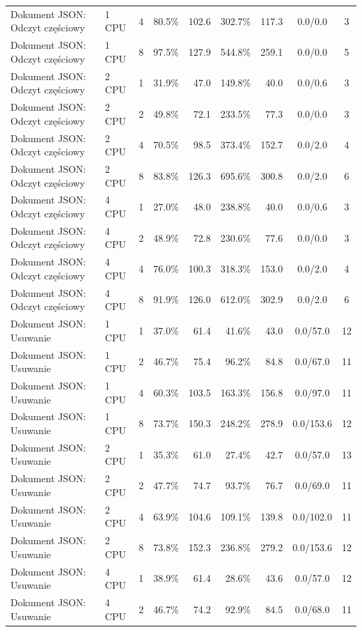 \begin{table}[ht]
{\begin{tabular}{llcrrrrcc}
Dokument JSON: Odczyt częściowy & 1 CPU & 4 & 80.5\% & 102.6 & 302.7\% & 117.3 & 0.0/0.0 & 3 \\
Dokument JSON: Odczyt częściowy & 1 CPU & 8 & 97.5\% & 127.9 & 544.8\% & 259.1 & 0.0/0.0 & 5 \\
Dokument JSON: Odczyt częściowy & 2 CPU & 1 & 31.9\% & 47.0 & 149.8\% & 40.0 & 0.0/0.6 & 3 \\
Dokument JSON: Odczyt częściowy & 2 CPU & 2 & 49.8\% & 72.1 & 233.5\% & 77.3 & 0.0/0.0 & 3 \\
Dokument JSON: Odczyt częściowy & 2 CPU & 4 & 70.5\% & 98.5 & 373.4\% & 152.7 & 0.0/2.0 & 4 \\
Dokument JSON: Odczyt częściowy & 2 CPU & 8 & 83.8\% & 126.3 & 695.6\% & 300.8 & 0.0/2.0 & 6 \\
Dokument JSON: Odczyt częściowy & 4 CPU & 1 & 27.0\% & 48.0 & 238.8\% & 40.0 & 0.0/0.6 & 3 \\
Dokument JSON: Odczyt częściowy & 4 CPU & 2 & 48.9\% & 72.8 & 230.6\% & 77.6 & 0.0/0.0 & 3 \\
Dokument JSON: Odczyt częściowy & 4 CPU & 4 & 76.0\% & 100.3 & 318.3\% & 153.0 & 0.0/2.0 & 4 \\
Dokument JSON: Odczyt częściowy & 4 CPU & 8 & 91.9\% & 126.0 & 612.0\% & 302.9 & 0.0/2.0 & 6 \\
Dokument JSON: Usuwanie & 1 CPU & 1 & 37.0\% & 61.4 & 41.6\% & 43.0 & 0.0/57.0 & 12 \\
Dokument JSON: Usuwanie & 1 CPU & 2 & 46.7\% & 75.4 & 96.2\% & 84.8 & 0.0/67.0 & 11 \\
Dokument JSON: Usuwanie & 1 CPU & 4 & 60.3\% & 103.5 & 163.3\% & 156.8 & 0.0/97.0 & 11 \\
Dokument JSON: Usuwanie & 1 CPU & 8 & 73.7\% & 150.3 & 248.2\% & 278.9 & 0.0/153.6 & 12 \\
Dokument JSON: Usuwanie & 2 CPU & 1 & 35.3\% & 61.0 & 27.4\% & 42.7 & 0.0/57.0 & 13 \\
Dokument JSON: Usuwanie & 2 CPU & 2 & 47.7\% & 74.7 & 93.7\% & 76.7 & 0.0/69.0 & 11 \\
Dokument JSON: Usuwanie & 2 CPU & 4 & 63.9\% & 104.6 & 109.1\% & 139.8 & 0.0/102.0 & 11 \\
Dokument JSON: Usuwanie & 2 CPU & 8 & 73.8\% & 152.3 & 236.8\% & 279.2 & 0.0/153.6 & 12 \\
Dokument JSON: Usuwanie & 4 CPU & 1 & 38.9\% & 61.4 & 28.6\% & 43.6 & 0.0/57.0 & 12 \\
Dokument JSON: Usuwanie & 4 CPU & 2 & 46.7\% & 74.2 & 92.9\% & 84.5 & 0.0/68.0 & 11 \\

\end{tabular}}
\end{table}
